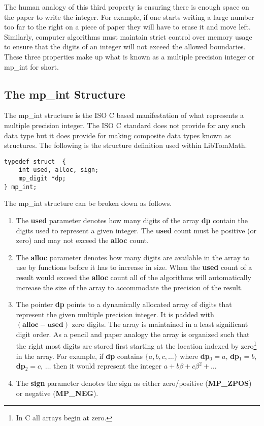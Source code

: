 \documentclass[b5paper]{book}
\begin{document}
The human analogy of this third property is ensuring there is enough space on the paper to write the integer.  For example,
if one starts writing a large number too far to the right on a piece of paper they will have to erase it and move left.  
Similarly, computer algorithms must maintain strict control over memory usage to ensure that the digits of an integer
will not exceed the allowed boundaries.  These three properties make up what is known as a multiple precision 
integer or mp\_int for short.  

\subsection{The mp\_int Structure}
\label{sec:MPINT}
The mp\_int structure is the ISO C based manifestation of what represents a multiple precision integer.  The ISO C standard does not provide for 
any such data type but it does provide for making composite data types known as structures.  The following is the structure definition 
used within LibTomMath.

\begin{verbatim}
typedef struct  {
    int used, alloc, sign;
    mp_digit *dp;
} mp_int;
\end{verbatim}

The mp\_int structure can be broken down as follows.

\begin{enumerate}
\item The \textbf{used} parameter denotes how many digits of the array \textbf{dp} contain the digits used to represent
a given integer.  The \textbf{used} count must be positive (or zero) and may not exceed the \textbf{alloc} count.  

\item The \textbf{alloc} parameter denotes how 
many digits are available in the array to use by functions before it has to increase in size.  When the \textbf{used} count 
of a result would exceed the \textbf{alloc} count all of the algorithms will automatically increase the size of the 
array to accommodate the precision of the result.  

\item The pointer \textbf{dp} points to a dynamically allocated array of digits that represent the given multiple 
precision integer.  It is padded with $(\textbf{alloc} - \textbf{used})$ zero digits.  The array is maintained in a least 
significant digit order.  As a pencil and paper analogy the array is organized such that the right most digits are stored
first starting at the location indexed by zero\footnote{In C all arrays begin at zero.} in the array.  For example, 
if \textbf{dp} contains $\lbrace a, b, c, \ldots \rbrace$ where \textbf{dp}$_0 = a$, \textbf{dp}$_1 = b$, \textbf{dp}$_2 = c$, $\ldots$ then 
it would represent the integer $a + b\beta + c\beta^2 + \ldots$  

 
\item The \textbf{sign} parameter denotes the sign as either zero/positive (\textbf{MP\_ZPOS}) or negative (\textbf{MP\_NEG}).  
\end{enumerate}
\end{document}
